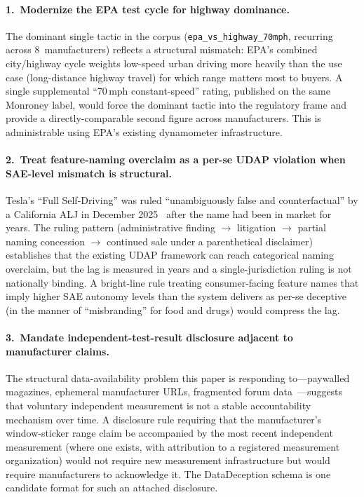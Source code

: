 \documentclass{article}
\begin{document}
\paragraph{1.\ Modernize the EPA test cycle for highway dominance.} The dominant single tactic in the corpus (\texttt{epa\_vs\_highway\_70mph}, recurring across 8~manufacturers) reflects a structural mismatch: EPA's combined city/highway cycle weights low-speed urban driving more heavily than the use case (long-distance highway travel) for which range matters most to buyers. A single supplemental ``70\,mph constant-speed'' rating, published on the same Monroney label, would force the dominant tactic into the regulatory frame and provide a directly-comparable second figure across manufacturers. This is administrable using EPA's existing dynamometer infrastructure.

\paragraph{2.\ Treat feature-naming overclaim as a per-se UDAP violation when SAE-level mismatch is structural.} Tesla's ``Full Self-Driving'' was ruled ``unambiguously false and counterfactual'' by a California ALJ in December 2025~\cite{techcrunch_fsd_ruling_2025} after the name had been in market for years. The ruling pattern (administrative finding $\to$ litigation $\to$ partial naming concession $\to$ continued sale under a parenthetical disclaimer) establishes that the existing UDAP framework can reach categorical naming overclaim, but the lag is measured in years and a single-jurisdiction ruling is not nationally binding. A bright-line rule treating consumer-facing feature names that imply higher SAE autonomy levels than the system delivers as per-se deceptive (in the manner of ``misbranding'' for food and drugs) would compress the lag.

\paragraph{3.\ Mandate independent-test-result disclosure adjacent to manufacturer claims.} The structural data-availability problem this paper is responding to---paywalled magazines, ephemeral manufacturer URLs, fragmented forum data~\cite{rtings_paywall_2026}---suggests that voluntary independent measurement is not a stable accountability mechanism over time. A disclosure rule requiring that the manufacturer's window-sticker range claim be accompanied by the most recent independent measurement (where one exists, with attribution to a registered measurement organization) would not require new measurement infrastructure but would require manufacturers to acknowledge it. The DataDeception schema is one candidate format for such an attached disclosure.
\end{document}

